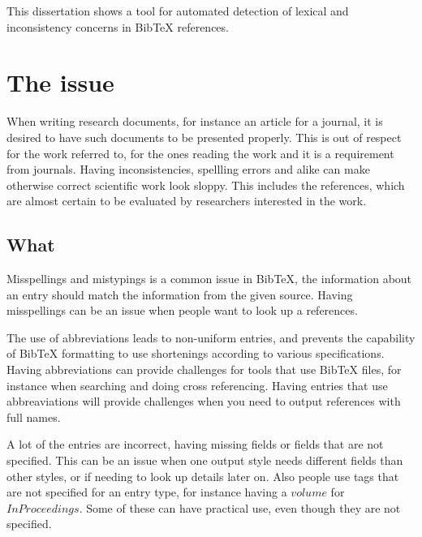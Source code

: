 
This dissertation shows a tool for automated detection of lexical and
inconsistency concerns in Bib{\TeX} references.


\section{The issue}

When writing research documents, for instance an article for a
journal, it is desired to have such documents to be presented
properly.  This is out of respect for the work referred to, for the
ones reading the work and it is a requirement from journals.  Having
inconsistencies, spellling errors and alike can make otherwise correct
scientific work look sloppy.  This includes the references, which are
almost certain to be evaluated by researchers interested in the work.


\subsection{What }
Misspellings and mistypings is a common issue in Bib{\TeX}, the
information about an entry should match the information from the given
source.  Having misspellings can be an issue when people want to look
up a references.

The use of abbreviations leads to non-uniform entries, and prevents
the capability of Bib{\TeX} formatting to use shortenings according to
various specifications.  Having abbreviations can provide challenges
for tools that use Bib{\TeX} files, for instance when searching and
doing cross referencing.  Having entries that use abbreaviations will
provide challenges when you need to output references with full names.

A lot of the entries are incorrect, having missing fields or fields
that are not specified.  This can be an issue when one output style
needs different fields than other styles, or if needing to look up
details later on.  Also people use tags that are not specified for an
entry type, for instance having a $volume$ for $InProceedings$.  Some
of these can have practical use, even though they are not specified.

